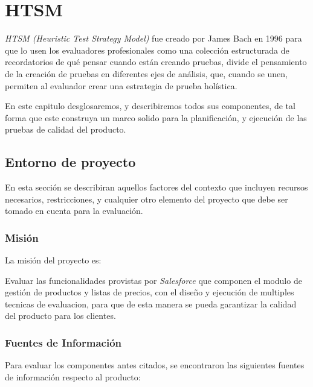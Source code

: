 \chapter{HTSM}

\emph{HTSM (Heuristic Test Strategy Model)} fue creado por James Bach en 1996
para que lo usen los evaluadores profesionales como una colección estructurada
de recordatorios de qué pensar cuando están creando pruebas, divide el
pensamiento de la creación de pruebas en diferentes ejes de análisis, que,
cuando se unen, permiten al evaluador crear una estrategia de prueba
holística\cite{Bach}.

En este capitulo desglosaremos, y describiremos todos sus componentes, de tal
forma que este construya un marco solido para la planificación, y ejecución de
las pruebas de calidad del producto.

\section{Entorno de proyecto}
En esta sección se describiran aquellos factores del contexto que incluyen
recursos necesarios, restricciones, y cualquier otro elemento del proyecto que
debe ser tomado en cuenta para la evaluación.

\subsection{Misión}
La misión del proyecto es:

Evaluar las funcionalidades provistas por \emph{Salesforce} que componen el
modulo de gestión de productos y listas de precios, con el diseño y ejecución de
multiples tecnicas de evaluacion, para que de esta manera se pueda garantizar la
calidad del producto para los clientes.

\subsection{Fuentes de Información}
Para evaluar los componentes antes citados, se encontraron las siguientes
fuentes de información respecto al producto:

